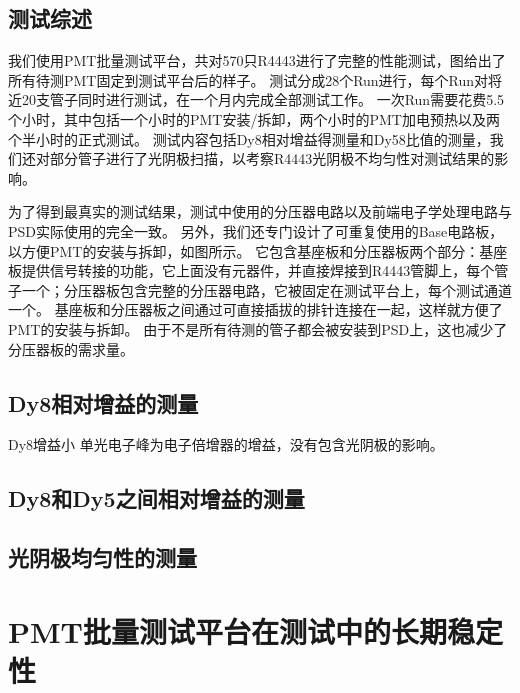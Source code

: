 \subsection{测试综述}
\label{sec:pmt_test:characterization_summary}
我们使用PMT批量测试平台，共对570只R4443进行了完整的性能测试，图给出了所有待测PMT固定到测试平台后的样子。
测试分成28个Run进行，每个Run对将近20支管子同时进行测试，在一个月内完成全部测试工作。
一次Run需要花费5.5个小时，其中包括一个小时的PMT安装/拆卸，两个小时的PMT加电预热以及两个半小时的正式测试。
测试内容包括Dy8相对增益得测量和Dy58比值的测量，我们还对部分管子进行了光阴极扫描，以考察R4443光阴极不均匀性对测试结果的影响。

为了得到最真实的测试结果，测试中使用的分压器电路以及前端电子学处理电路与PSD实际使用的完全一致。
另外，我们还专门设计了可重复使用的Base电路板，以方便PMT的安装与拆卸，如图所示。
它包含基座板和分压器板两个部分：基座板提供信号转接的功能，它上面没有元器件，并直接焊接到R4443管脚上，每个管子一个；分压器板包含完整的分压器电路，它被固定在测试平台上，每个测试通道一个。
基座板和分压器板之间通过可直接插拔的排针连接在一起，这样就方便了PMT的安装与拆卸。
由于不是所有待测的管子都会被安装到PSD上，这也减少了分压器板的需求量。

\subsection{Dy8相对增益的测量}
\label{sec:pmt_test:relative_gain}
Dy8增益小
单光电子峰为电子倍增器的增益，没有包含光阴极的影响。


\subsection{Dy8和Dy5之间相对增益的测量}
\label{sec:pmt_test:dy58}

\subsection{光阴极均匀性的测量}
\label{sec:pmt_test:cathode_scanning}

\section{PMT批量测试平台在测试中的长期稳定性}
\label{sec:pmt_test:testbench_performance}

